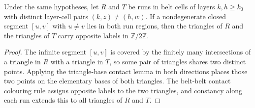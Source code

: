 \begin{lemma}
    \label{thm:area_law_belt_runs_interface_colors}
    \leanok
    Under the same hypotheses, let $R$ and $T$ be runs in belt cells of
    layers $k,h\ge k_0$ with distinct layer-cell pairs $(k,z)\ne(h,w)$.
    If a nondegenerate closed segment $[u,v]$ with $u\ne v$ lies in both
    run regions, then the triangles of $R$ and the triangles of $T$ carry
    opposite labels in $\mathbb Z/2\mathbb Z$.
\end{lemma}
\begin{proof}\leanok
    The infinite segment $[u,v]$ is covered by the finitely many intersections
    of a triangle in $R$ with a triangle in $T$, so some pair of triangles
    shares two distinct points. Applying the triangle-base contact lemma in
    both directions places those two points on the elementary bases of both
    triangles. The belt-belt contact colouring rule assigns opposite labels
    to the two triangles, and constancy along each run extends this to all
    triangles of $R$ and $T$.
\end{proof}
